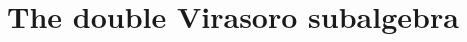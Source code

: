 \documentclass[aps,10pt,twocolumn,superscriptaddress]{revtex4-2}
\def\ie{\begin{equation}\begin{aligned}}
\def\fe{\end{aligned}\end{equation}}
\def\NS{\mathrm{NS}}
\def\R{\mathrm{R}}
\begin{document}

\section{The double Virasoro subalgebra}

\label{sec:2Vir}
\end{document}
